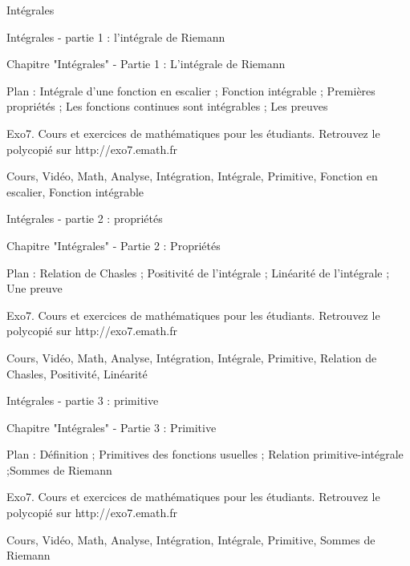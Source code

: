 
   Intégrales

Intégrales - partie 1 : l'intégrale de Riemann



Chapitre "Intégrales" - Partie 1 : L'intégrale de Riemann

Plan : Intégrale d'une fonction en escalier ; Fonction intégrable ;
Premières propriétés ; Les fonctions continues sont intégrables ;
Les preuves

Exo7. Cours et exercices de mathématiques pour les étudiants.
Retrouvez le polycopié sur http://exo7.emath.fr


Cours, Vidéo, Math, Analyse, Intégration, Intégrale, Primitive, Fonction en escalier,
Fonction intégrable



Intégrales - partie 2 : propriétés



Chapitre "Intégrales" - Partie 2 : Propriétés

Plan : Relation de Chasles ; Positivité de l'intégrale ;
Linéarité de l'intégrale ; Une preuve

Exo7. Cours et exercices de mathématiques pour les étudiants.
Retrouvez le polycopié sur http://exo7.emath.fr


Cours, Vidéo, Math, Analyse, Intégration, Intégrale, Primitive, Relation de Chasles, 
Positivité, Linéarité



Intégrales - partie 3 : primitive



Chapitre "Intégrales" - Partie 3 : Primitive 

Plan : Définition ; Primitives des fonctions usuelles ;
Relation primitive-intégrale ;Sommes de Riemann 

Exo7. Cours et exercices de mathématiques pour les étudiants.
Retrouvez le polycopié sur http://exo7.emath.fr


Cours, Vidéo, Math, Analyse, Intégration, Intégrale, Primitive, Sommes de Riemann 


